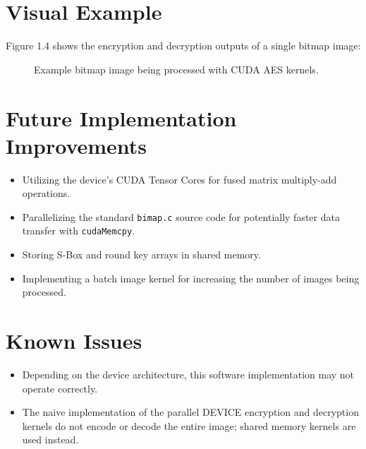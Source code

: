 \section{Visual Example}

Figure 1.4 shows the encryption and decryption outputs of a single bitmap image:

\vspace{-0.3in}
\begin{figure}[!ht]\centering
{}
\caption{Example bitmap image being processed with CUDA AES kernels.}
\label{fig}
\end{figure}

\newpage
\section{Future Implementation Improvements}
\begin{itemize}
    \item Utilizing the device's CUDA Tensor Cores for fused matrix multiply-add operations.
    \item Parallelizing the standard \texttt{bimap.c} source code for potentially faster data transfer with \texttt{cudaMemcpy}.
    \item Storing S-Box and round key arrays in shared memory.
    \item Implementing a batch image kernel for increasing the number of images being processed.
\end{itemize}

\section{Known Issues}
\begin{itemize}
    \item Depending on the device architecture, this software implementation may not operate correctly.
    \item The naive implementation of the parallel DEVICE encryption and decryption kernels do not encode or decode the entire image; shared memory kernels are used instead.
\end{itemize}

